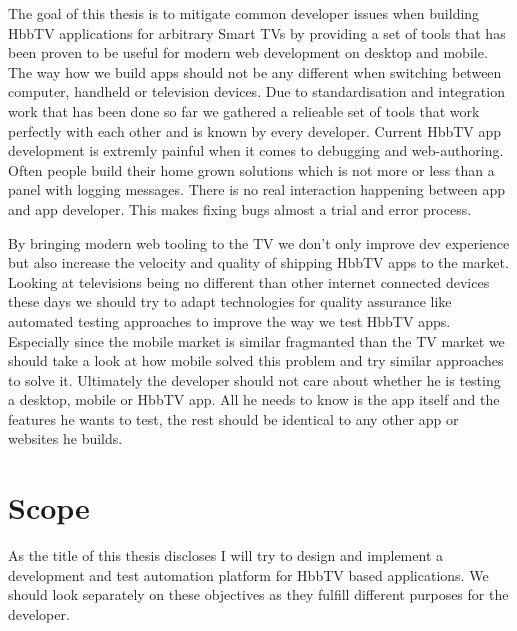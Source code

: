 The goal of this thesis is to mitigate common developer issues when building HbbTV applications for arbitrary
Smart TVs by providing a set of tools that has been proven to be useful for modern web development on desktop
and mobile. The way how we build apps should not be any different when switching between computer, handheld or
television devices. Due to standardisation and integration work that has been done so far we gathered a relieable
set of tools that work perfectly with each other and is known by every developer. Current HbbTV app development
is extremly painful when it comes to debugging and web-authoring. Often people build their home grown solutions
which is not more or less than a panel with logging messages. There is no real interaction happening between app
and app developer. This makes fixing bugs almost a trial and error process.

By bringing modern web tooling to the TV we don't only improve dev experience but also increase the velocity
and quality of shipping HbbTV apps to the market. Looking at televisions being no different than other internet
connected devices these days we should try to adapt technologies for quality assurance like automated testing
approaches to improve the way we test HbbTV apps. Especially since the mobile market is similar fragmanted
than the TV market we should take a look at how mobile solved this problem and try similar approaches to solve
it. Ultimately the developer should not care about whether he is testing a desktop, mobile or HbbTV app. All
he needs to know is the app itself and the features he wants to test, the rest should be identical to any other
app or websites he builds.

\section{Scope\label{sec:scope}}

As the title of this thesis discloses I will try to design and implement a development and test automation
platform for HbbTV based applications. We should look separately on these objectives as they fulfill different
purposes for the developer.

